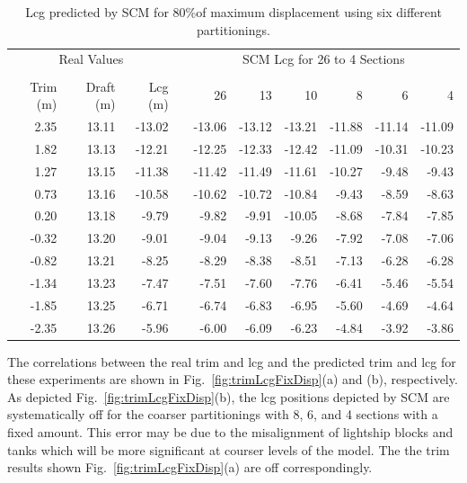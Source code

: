 \documentclass[runningheads]{llncs}
\begin{document}
\begin{table}[h!]
\begin{tabular}{rrrc@{\:\:}@{\:\:}r@{\:\:\:\:}r@{\:\:\:\:}r@{\:\:\:\:}r@{\:\:\:\:}r@{\:\:\:\:}r}
\multicolumn{3}{c}{Real Values}& &\multicolumn{6}{c}{SCM Lcg for 26 to 4 Sections}\\[0.1ex] \cline{1-3} \cline{5-10}
\\[-1.5ex]
Trim (m)       & Draft (m)   & Lcg (m) &      & 26        &13        &10        &8          &6          &4\\
\hline \rule{0pt}{3ex}
2.35        &13.11  &-13.02 &&-13.06 &-13.12 &-13.21 &-11.88 &-11.14 &-11.09  \\
1.82        &13.13  &-12.21 &&-12.25 &-12.33 &-12.42 &-11.09 &-10.31 &-10.23  \\
1.27        &13.15  &-11.38 &&-11.42 &-11.49 &-11.61 &-10.27 &-9.48   &-9.43   \\
0.73        &13.16  &-10.58 &&-10.62 &-10.72 &-10.84 &-9.43   &-8.59   &-8.63   \\
0.20        &13.18  &-9.79   &&-9.82   &-9.91   &-10.05 &-8.68   &-7.84   &-7.85   \\
-0.32      &13.20  &-9.01   &&-9.04   &-9.13   &-9.26   &-7.92   &-7.08   &-7.06   \\
-0.82      &13.21  &-8.25   &&-8.29   &-8.38   &-8.51   &-7.13   &-6.28   &-6.28   \\
-1.34      &13.23  &-7.47   &&-7.51   &-7.60   &-7.76   &-6.41   &-5.46   &-5.54   \\
-1.85      &13.25  &-6.71   &&-6.74   &-6.83   &-6.95   &-5.60   &-4.69   &-4.64   \\
-2.35      &13.26  &-5.96   &&-6.00   &-6.09   &-6.23   &-4.84   &-3.92   &-3.86   \\
\end{tabular}
\caption{Lcg predicted by SCM for 80\%of maximum displacement using six different partitionings.}
\label{tbl:lcgVarPart}
\end{table}
The correlations between the real trim and lcg and the predicted trim and lcg for these experiments are shown in Fig.~\ref{fig:trimLcgFixDisp}(a) and (b), respectively. As depicted Fig.~\ref{fig:trimLcgFixDisp}(b), the lcg positions depicted by SCM are systematically off for the coarser partitionings with 8, 6, and 4 sections with a fixed amount. This error may be due to the misalignment of lightship blocks and tanks which will be more significant at courser levels of the model. The the trim results shown Fig.~\ref{fig:trimLcgFixDisp}(a) are off correspondingly. 
\end{document}
